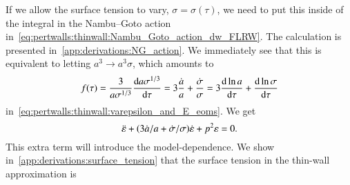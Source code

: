     If we allow the surface tension to vary, $\sigma=\sigma(\tau)$, %
    we need to put this inside of the integral in the Nambu--Goto action in~\cref{eq:pertwalls:thinwall:Nambu_Goto_action_dw_FLRW}. The calculation is presented in~\cref{app:derivations:NG_action}. We immediately see that this is equivalent to letting $a^3\to a^3 \sigma$, which amounts to
    \begin{equation}
        f(\tau) = \frac{3}{a\sigma^{1/3}} \dv{a\sigma^{1/3}}{\tau} =  3\frac{\dot{a}}{a} +  \frac{\dot{\sigma}}{\sigma} = 3\dv{\ln{a}}{\tau} + \dv{\ln{\sigma}}{\tau}
    \end{equation}
    in~\cref{eq:pertwalls:thinwall:varepsilon_and_E_eoms}. We get
    \begin{equation}
        \ddot{\varepsilon} + {\left( 3\dot{a}/a + \dot{\sigma}/\sigma \right)}\dot{\varepsilon} +p^2 \varepsilon = 0.
    \end{equation}
    This extra term will introduce the model-dependence. We show in~\cref{app:derivations:surface_tension} that the surface tension in the thin-wall approximation is
